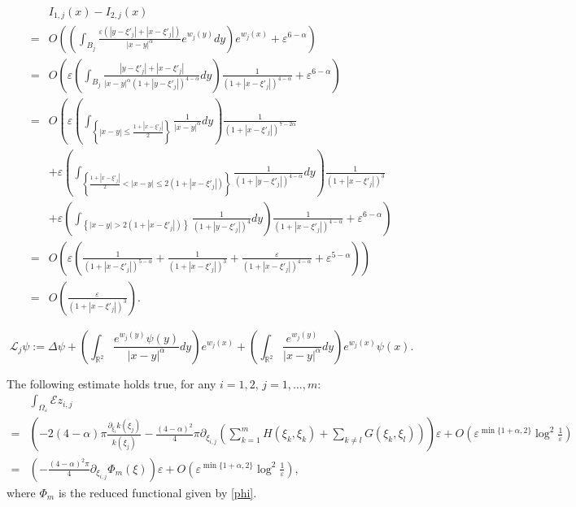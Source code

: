 \documentclass[10pt,a4paper]{amsart}
\begin{document}
\begin{align}
\nonumber&I_{1,j}(x)-I_{2,j}(x)\\
\nonumber=&O\left(\left(\int_{B_j}\frac{\varepsilon\left(\left|y-\xi'_j\right|+\left|x-\xi'_j\right|\right)}{|x-y|^\alpha}e^{w_j(y)}dy\right)e^{w_j(x)}+\varepsilon^{6-\alpha}\right)\\
\nonumber=&O\left(\varepsilon\left(\int_{B_j}\frac{\left|y-\xi'_j\right|+\left|x-\xi'_j\right|}{|x-y|^\alpha\left(1+\left|y-\xi'_j\right|\right)^{4-\alpha}}dy\right)\frac1{\left(1+\left|x-\xi'_j\right|\right)^{4-\alpha}}+\varepsilon^{6-\alpha}\right)\\
\nonumber=&O\left(\varepsilon\left(\int_{\left\{|x-y|\le\frac{1+\left|x-\xi'_j\right|}2\right\}}\frac1{|x-y|^\alpha}dy\right)\frac1{\left(1+\left|x-\xi'_j\right|\right)^{7-2\alpha}}\right.\\
\nonumber&\left.+\varepsilon\left(\int_{\left\{\frac{1+\left|x-\xi'_j\right|}2<|x-y|\le2\left(1+\left|x-\xi'_j\right|\right)\right\}}\frac1{\left(1+\left|y-\xi'_j\right|\right)^{4-\alpha}}dy\right)\frac1{\left(1+\left|x-\xi'_j\right|\right)^3}\right.\\
\nonumber&\left.+\varepsilon\left(\int_{\left\{|x-y|>2\left(1+\left|x-\xi'_j\right|\right)\right\}}\frac1{\left(1+\left|y-\xi'_j\right|\right)^4}dy\right)\frac1{\left(1+\left|x-\xi'_j\right|\right)^{4-\alpha}}+\varepsilon^{6-\alpha}\right)\\
\nonumber=&O\left(\varepsilon\left(\frac1{\left(1+\left|x-\xi'_j\right|\right)^{5-\alpha}}+\frac1{\left(1+\left|x-\xi'_j\right|\right)^3}+\frac\varepsilon{\left(1+\left|x-\xi'_j\right|\right)^{4-\alpha}}+\varepsilon^{5-\alpha}\right)\right)\\
\label{i1j-i2j}=&O\left(\frac{\varepsilon}{\left(1+\left|x-\xi'_j\right|\right)^3}\right).
\end{align}

\begin{equation}
\label{lj}\mathcal L_j\psi:=\Delta\psi+\left(\int_{\mathbb R^2}\frac{e^{w_j(y)}\psi(y)}{|x-y|^\alpha}dy\right)e^{w_j(x)}+\left(\int_{\mathbb R^2}\frac{e^{w_j(y)}}{|x-y|^\alpha}dy\right)e^{w_j(x)}\psi(x).
\end{equation}

\begin{proposition}\label{mainorder}
The following estimate holds true, for any $i=1,2,\,j=1,\dots,m$:
\begin{align*}
&\int_{\Omega_\varepsilon}\mathcal Ez_{i,j}\\
=&\left(-2(4-\alpha)\pi\frac{\partial_{\xi_i}k(\xi_j)}{k(\xi_j)}-\frac{(4-\alpha)^2}4\pi\partial_{\xi_{i,j}}\left(\sum_{k=1}^mH(\xi_k,\xi_k)+\sum_{k\ne l}G(\xi_k,\xi_l)\right)\right)\varepsilon+O\left(\varepsilon^{\min\{1+\alpha,2\}}\log^2\frac1\varepsilon\right)\\
=&\left(-\frac{(4-\alpha)^2\pi}4\partial_{\xi_{i,j}}\Phi_m(\xi)\right)\varepsilon+O\left(\varepsilon^{\min\{1+\alpha,2\}}\log^2\frac1\varepsilon\right),
\end{align*}
where $\Phi_m$ is the reduced functional given by \eqref{phi}.
\end{proposition}
\end{document}
